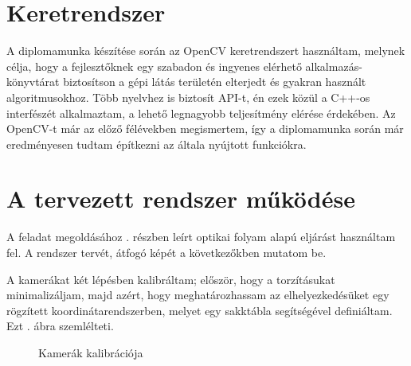 \section{Keretrendszer}

A diplomamunka készítése során az OpenCV \cite{opencv} keretrendszert használtam, melynek célja, hogy a fejlesztőknek egy szabadon és ingyenes elérhető alkalmazás-könyvtárat biztosítson a gépi látás területén elterjedt és gyakran használt algoritmusokhoz. Több nyelvhez is biztosít API-t, én ezek közül a C++-os interfészét alkalmaztam, a lehető legnagyobb teljesítmény elérése érdekében. Az OpenCV-t már az előző félévekben megismertem, így a diplomamunka során már eredményesen tudtam építkezni az általa nyújtott funkciókra.

\section{A tervezett rendszer működése}

A feladat megoldásához . részben leírt optikai folyam alapú eljárást használtam fel. A rendszer tervét, átfogó képét a következőkben mutatom be.

A kamerákat két lépésben kalibráltam; először, hogy a torzításukat minimalizáljam, majd azért, hogy meghatározhassam az elhelyezkedésüket egy rögzített koordinátarendszerben, melyet egy sakktábla segítségével definiáltam. Ezt . ábra szemlélteti.

\begin{figure}[tbh]
\centering


\caption{Kamerák kalibrációja \label{fig:plan-calibration}}
\end{figure}

